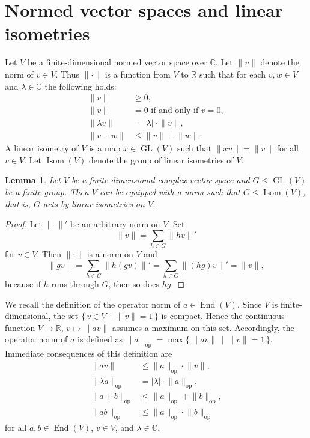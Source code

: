 \documentclass[12pt]{amsart}
\theoremstyle{plain}
\newtheorem{lemma}[theorem]{Lemma}
\theoremstyle{definition}
\numberwithin{equation}{section}
\newcommand*{\abs}[1]{\lvert#1\rvert}
\newcommand*{\norm}[1]{\lVert#1\rVert}
\newcommand*{\normop}[1]{\lVert#1\rVert_\text{op}}
\newcommand*{\defset}[2]{\{\,#1\,\mid\,#2\,\}}
\newcommand*{\CC}{\mathbb C}
\newcommand*{\RR}{\mathbb R}
\DeclareMathOperator{\GL}{GL}
\DeclareMathOperator{\End}{End}
\DeclareMathOperator{\U}{Isom}
\begin{document}
\section{Normed vector spaces and linear isometries}
Let $V$ be a finite-dimensional normed vector space over $\CC$. Let
$\norm{v}$ denote the norm of $v\in V$. Thus $\norm{\cdot}$ is a
function from $V$ to $\RR$ such that for each $v, w\in V$ and
$\lambda\in\CC$ the following holds:
\begin{align*}
  \norm{v}&\ge0,\\
  \norm{v}&=0\text{ if and only if }v=0,\\
  \norm{\lambda v}&=\abs{\lambda}\cdot\norm{v},\\
  \norm{v+w}&\le\norm{v}+\norm{w}.                           
\end{align*}
A linear isometry of $V$ is a map $x\in\GL(V)$ such that
$\norm{xv}=\norm{v}$ for all $v\in V$. Let $\U(V)$ denote the group of
linear isometries of $V$.
\begin{lemma}\label{l:uv}
  Let $V$ be a finite-dimensional complex vector space and
  $G\le\GL(V)$ be a finite group. Then $V$ can be equipped with a norm
  such that $G\le \U(V)$, that is, $G$ acts by linear isometries on
  $V$.
\end{lemma}
\begin{proof}
  Let $\norm{\cdot}'$ be an arbitrary norm on $V$. Set
  \[
    \norm{v}=\sum_{h\in G}\norm{hv}'
  \]
  for $v\in V$. Then $\norm{\cdot}$ is a norm on $V$ and
  \[
    \norm{gv}=\sum_{h\in G}\norm{h(gv)}'=
           \sum_{h\in G}\norm{(hg)v}'=\norm{v},
  \]
  because if $h$ runs through $G$, then so does $hg$.
\end{proof}
We recall the definition of the operator norm of $a\in\End(V)$. Since
$V$ is finite-dimensional, the set $\defset{v\in V}{\norm{v}=1}$ is
compact. Hence the continuous function $V\to\RR$, $v\mapsto\norm{av}$
assumes a maximum on this set. Accordingly, the operator norm of $a$
is defined as
$\normop{a}=\max\defset{\norm{av}}{\norm{v}=1}$. Immediate
consequences of this definition are
\begin{align*}
  \norm{av}&\le\normop{a}\cdot\norm{v},\\
  \normop{\lambda a}&=\abs{\lambda}\cdot\normop{a},\\
  \normop{a+b}&\le\normop{a}+\normop{b},\\
  \normop{ab}&\le\normop{a}\cdot\normop{b}
\end{align*}              
for all $a, b\in\End(V)$, $v\in V$, and $\lambda\in\CC$.
\end{document}
